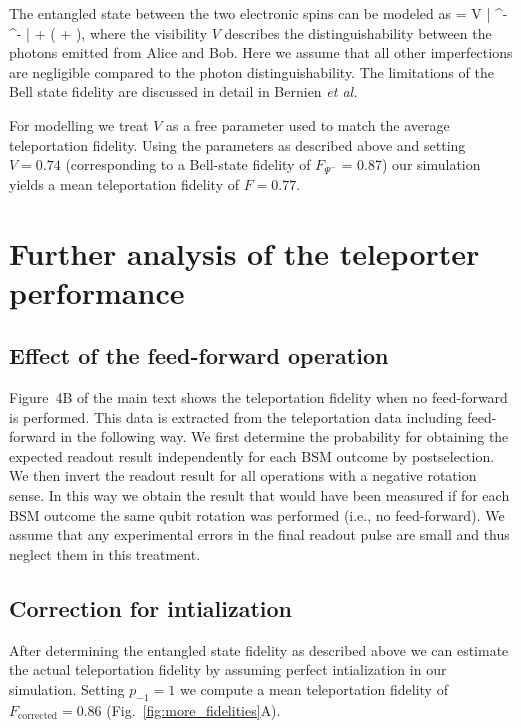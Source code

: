 The entangled state between the two electronic spins can be modeled as
\be
    \rho = V | \Psi^- \rangle \langle \Psi^- | +  \left(  +  \right ),
\ee
where the visibility $V$ describes the distinguishability between the photons emitted from Alice and Bob. Here we assume that all other imperfections are negligible compared to the photon distinguishability. The limitations of the Bell state fidelity are discussed in detail in Bernien {\em et al.}\cite{2013Natur.497...86B}

For modelling we treat $V$ as a free parameter used to match the average teleportation fidelity. Using the parameters as described above and setting $V = 0.74$ (corresponding to a Bell-state fidelity of $F_{\Psi^-}$ = 0.87) our simulation yields a mean teleportation fidelity of $F = 0.77$.

\section{Further analysis of the teleporter performance}

\subsection{Effect of the feed-forward operation}

Figure~4B of the main text shows the teleportation fidelity when no feed-forward is performed. This data is extracted from the teleportation data including feed-forward in the following way. We first determine the probability for obtaining the expected readout result independently for each BSM outcome by postselection. We then invert the readout result for all operations with a negative rotation sense. In this way we obtain the result that would have been measured if for each BSM outcome the same qubit rotation was performed (i.e., no feed-forward). We assume that any experimental errors in the final readout pulse are small and thus neglect them in this treatment.

\subsection{Correction for intialization}

After determining the entangled state fidelity as described above we can estimate the actual teleportation fidelity by assuming perfect intialization in our simulation. Setting $p_{-1} = 1$ we compute a mean teleportation fidelity of $F_\text{corrected} = 0.86$ (Fig.~\ref{fig:more_fidelities}A).

